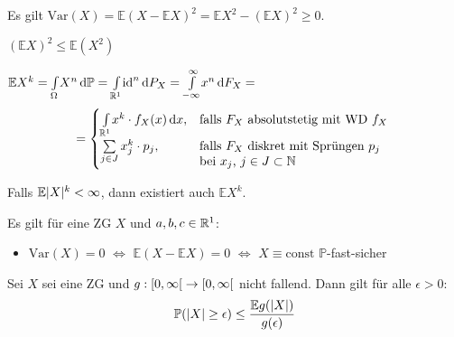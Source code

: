\documentclass{cheat-sheet}
\renewcommand{\P}{\mathbb{P}} %
\newcommand{\E}{\mathbb{E}} %
\newcommand{\Var}{\mathrm{Var}} %
\begin{document}
\begin{lem}
  Es gilt $\Var(X) = \E (X {-} \E X)^2 = \E X^2 - (\E X)^2 \geq 0$.
\end{lem}

\begin{kor}
  $(\E X)^2 \leq \E (X^2)$
\end{kor}

\begin{lem}
  $\E X^k = \Int{\Omega}{}{X^n}{\P} = \Int{\R^1}{}{\id^n}{P_X} = \Int{-\infty}{\infty}{x^n}{F_X} =$
  \[
    \qquad = \begin{cases}
      \Int{\R^1}{}{x^k \cdot f_X(x)}{x}, & \text{falls $F_X$ absolutstetig mit WD $f_X$} \\
      \sum_{j \in J} x_j^k \cdot p_j, & \parbox[t]{0.5\textwidth}{falls $F_X$ diskret mit Sprüngen $p_j$ \\ bei $x_j$, $j \in J \subset \N$}
    \end{cases}
  \]
\end{lem}

\begin{bem}
  Falls $\E \abs{X}^k < \infty$, dann existiert auch $\E X^k$.
\end{bem}

\begin{lem}
  Es gilt für eine ZG $X$ und $a, b, c \in \mathbb{R}^1$:
  \begin{itemize}
    \item $\Var(X) = 0$ $\iff$ $\E (X - \E X) = 0$ $\iff$ $X \equiv \mathrm{const}$ $\P$-fast-sicher
  \end{itemize}
\end{lem}


\begin{satz}
  Sei $X$ sei eine ZG und $g : \left[ 0, \infty \right[ \to \left[ 0, \infty \right[$ nicht fallend. Dann gilt für alle $\epsilon > 0$:
  \[ \P(\abs{X} \geq \epsilon) \leq \frac{\E g(\abs{X})}{g(\epsilon)} \]
\end{satz}
\end{document}

